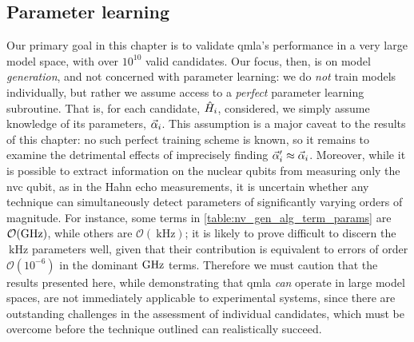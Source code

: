 \subsection{Parameter learning}
Our primary goal in this chapter is to validate \gls{qmla}'s performance in a 
    very large \gls{model space}, with over $10^{10}$ valid candidates. 
Our focus, then, is on model \emph{generation}, and not concerned with parameter learning:
    we do \emph{not} train models individually, but rather we assume access to a \emph{perfect} parameter learning subroutine.
That is, for each candidate, $\hat{H}_i$, considered, we simply assume knowledge of its parameters, $\vec{\alpha}_i$. 
This assumption is a major caveat to the results of this chapter: 
    no such perfect training scheme is known, 
    so it remains to examine the detrimental effects of imprecisely finding $\vec{\alpha}^{\prime}_i \approx \vec{\alpha}_i$. 
Moreover, while it is possible to extract information on the nuclear qubits from measuring only the 
    \gls{nvc} qubit, as in the Hahn echo measurements, 
    it is uncertain whether any technique can simultaneously detect parameters of significantly varying orders of magnitude.
For instance, some terms in \cref{table:nv_gen_alg_term_params} are $\mathcal{O}(\textrm{GHz})$, 
    while others are $\mathcal{O}(\SI{}{\kilo\hertz})$;
    it is likely to prove difficult to discern the $\SI{}{\kilo\hertz}$ parameters well, given that their contribution is equivalent 
    to errors of order $\mathcal{O}(10^{-6})$ in the dominant $\textrm{GHz}$ terms. 
Therefore we must caution that the results presented here, 
    while demonstrating that \gls{qmla} \emph{can} operate in large model spaces, 
    are not immediately applicable to experimental systems, 
    since there are outstanding challenges in the assessment of individual candidates, 
    which must be overcome before the technique outlined can realistically succeed. 


